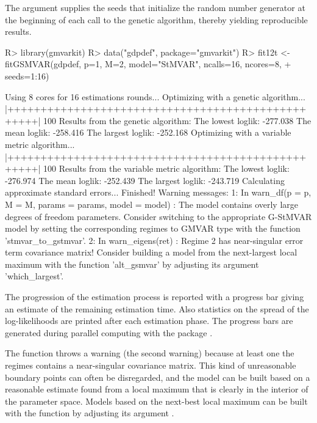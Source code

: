 \documentclass[nojss]{jss}
\begin{document}
The argument  supplies the seeds that initialize the random number generator at the beginning of each call to the genetic algorithm, thereby yielding reproducible results.
%
\begin{CodeChunk}
\begin{CodeInput}
R> library(gmvarkit)
R> data("gdpdef", package="gmvarkit")
R> fit12t <- fitGSMVAR(gdpdef, p=1, M=2, model="StMVAR", ncalls=16, ncores=8,
+    seeds=1:16)
\end{CodeInput}
\begin{CodeOutput}
Using 8 cores for 16 estimations rounds...
Optimizing with a genetic algorithm...
  |++++++++++++++++++++++++++++++++++++++++++++++++++| 100%
Results from the genetic algorithm:
The lowest loglik:  -277.038
The mean loglik:    -258.416
The largest loglik: -252.168
Optimizing with a variable metric algorithm...
  |++++++++++++++++++++++++++++++++++++++++++++++++++| 100%
Results from the variable metric algorithm:
The lowest loglik:  -276.974
The mean loglik:    -252.439
The largest loglik: -243.719
Calculating approximate standard errors...
Finished!
Warning messages:
1: In warn_df(p = p, M = M, params = params, model = model) :
  The model contains overly large degrees of freedom parameters. Consider
  switching to the appropriate G-StMVAR model by setting the corresponding
  regimes to GMVAR type with the function 'stmvar_to_gstmvar'.
2: In warn_eigens(ret) :
  Regime 2 has near-singular error term covariance matrix! Consider
  building a model from the next-largest local maximum with the function
  'alt_gsmvar' by adjusting its argument 'which_largest'.
\end{CodeOutput}
\end{CodeChunk}
%
The progression of the estimation process is reported with a progress bar giving an estimate of the remaining estimation time. Also statistics on the spread of the log-likelihoods are printed after each estimation phase. The progress bars are generated during parallel computing with the package  \citep{Solymos+Zawadzki:2020}.

The function throws a warning (the second warning) because at least one the regimes contains a near-singular covariance matrix. This kind of unreasonable boundary points can often be disregarded, and the model can be built based on a reasonable estimate found from a local maximum that is clearly in the interior of the parameter space. Models based on the next-best local maximum can be built with the function  by adjusting its argument .
\end{document}
